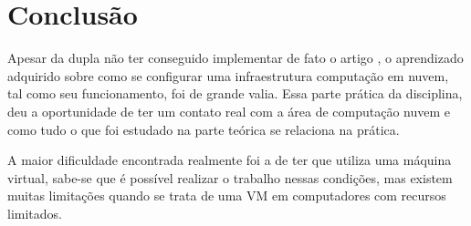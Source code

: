 \chapter[Conclusão]{Conclusão}\label{cap1}

Apesar da dupla não ter conseguido implementar de fato o artigo \cite{ref1}, o aprendizado adquirido sobre como se configurar uma infraestrutura computação em nuvem, tal como seu funcionamento, foi de grande valia. Essa parte prática da disciplina, deu a oportunidade de ter um contato real com a área de computação nuvem e como tudo o que foi estudado na parte teórica se relaciona na prática.

A maior dificuldade encontrada realmente foi a de ter que utiliza uma máquina virtual, sabe-se que é possível realizar o trabalho nessas condições, mas existem muitas limitações quando se trata de uma VM em computadores com recursos limitados.
